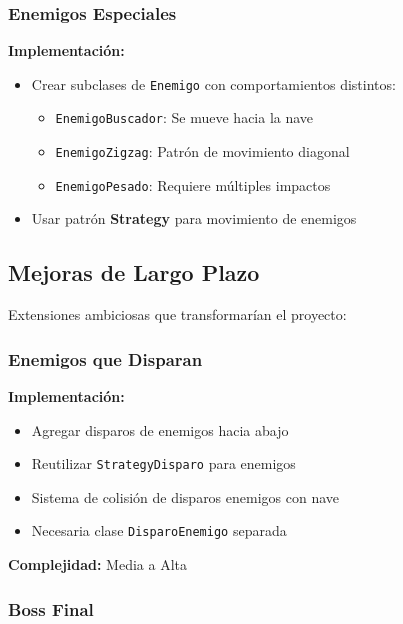 \documentclass[12pt, a4paper]{article}
\begin{document}
\subsubsection{Enemigos Especiales}

\textbf{Implementación:}
\begin{itemize}[leftmargin=2em]
    \item Crear subclases de \texttt{Enemigo} con comportamientos distintos:
        \begin{itemize}[leftmargin=1.5em]
            \item \texttt{EnemigoBuscador}: Se mueve hacia la nave
            \item \texttt{EnemigoZigzag}: Patrón de movimiento diagonal
            \item \texttt{EnemigoPesado}: Requiere múltiples impactos
        \end{itemize}
    \item Usar patrón \textbf{Strategy} para movimiento de enemigos
\end{itemize}

\subsection{Mejoras de Largo Plazo}

Extensiones ambiciosas que transformarían el proyecto:

\subsubsection{Enemigos que Disparan}

\textbf{Implementación:}
\begin{itemize}[leftmargin=2em]
    \item Agregar disparos de enemigos hacia abajo
    \item Reutilizar \texttt{StrategyDisparo} para enemigos
    \item Sistema de colisión de disparos enemigos con nave
    \item Necesaria clase \texttt{DisparoEnemigo} separada
\end{itemize}

\textbf{Complejidad:} Media a Alta

\subsubsection{Boss Final}
\end{document}
